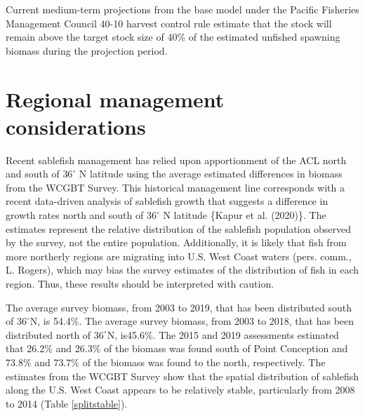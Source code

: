 \documentclass[11pt,
  english,
  a4paper,
]{article}
\begin{document}
\leavevmode\tagmcend\tagstructend\par


Current medium-term projections from the base model under the Pacific Fisheries Management Council 40-10 harvest control rule estimate that the stock will remain above the target stock size of 40\% of the estimated unfished spawning biomass during the projection period.

\leavevmode\tagmcend\tagstructend\par


\hypertarget{regional-management-considerations}{%
\section{Regional management considerations}\label{regional-management-considerations}}

\leavevmode\tagmcend\tagstructend


Recent sablefish management has relied upon apportionment of the ACL north and south of {\(36^\circ\)\leavevmode\tagmcend\tagstructend} N latitude using the average estimated differences in biomass from the WCGBT Survey. This historical management line corresponds with a recent data-driven analysis of sablefish growth that suggests a difference in growth rates north and south of {\(36^\circ\)\leavevmode\tagmcend\tagstructend} N latitude \{{Kapur et al. (2020)\leavevmode\tagmcend\tagstructend}\}. The estimates represent the relative distribution of the sablefish population observed by the survey, not the entire population. Additionally, it is likely that fish from more northerly regions are migrating into U.S. West Coast waters (pers. comm., L. Rogers), which may bias the survey estimates of the distribution of fish in each region. Thus, these results should be interpreted with caution.

\leavevmode\tagmcend\tagstructend\par


The average survey biomass, from 2003 to 2019, that has been distributed south of {\(36^\circ\)\leavevmode\tagmcend\tagstructend}N, is 54.4\%. The average survey biomass, from 2003 to 2018, that has been distributed north of {\(36^\circ\)\leavevmode\tagmcend\tagstructend}N, is45.6\%. The 2015 and 2019 assessments estimated that 26.2\% and 26.3\% of the biomass was found south of Point Conception and 73.8\% and 73.7\% of the biomass was found to the north, respectively. The estimates from the WCGBT Survey show that the spatial distribution of sablefish along the U.S. West Coast appears to be relatively stable, particularly from 2008 to 2014 (Table \ref{splitstable}).
\end{document}

